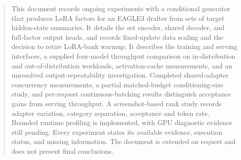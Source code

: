 \documentclass{article}
\begin{document}
\printAffiliationsAndNotice{}

\begin{abstract}
This document records ongoing experiments with a conditional generator that
produces LoRA factors for an EAGLE3 drafter from sets of target hidden-state
summaries. It details the set encoder, shared decoder, and full-factor output
heads, and records fixed-update data scaling and the decision to retire
LoRA-bank warmup. It describes the training and serving interfaces, a supplied
four-model throughput comparison on in-distribution and out-of-distribution
workloads, activation-cache measurements, and an unresolved output-repeatability
investigation. Completed shared-adapter concurrency measurements, a partial matched-budget
conditioning-size study, and per-request continuous-batching results distinguish
acceptance gains from serving throughput. A screenshot-based rank study records
adapter variation, category separation, acceptance and token rate. Bounded runtime
profiling is implemented, with GPU diagnostic evidence still pending. Every experiment states its
available evidence, execution status, and missing information. The document
is extended on request and does not present final conclusions.
\end{abstract}







\clearpage
\appendix
\small


\end{document}
